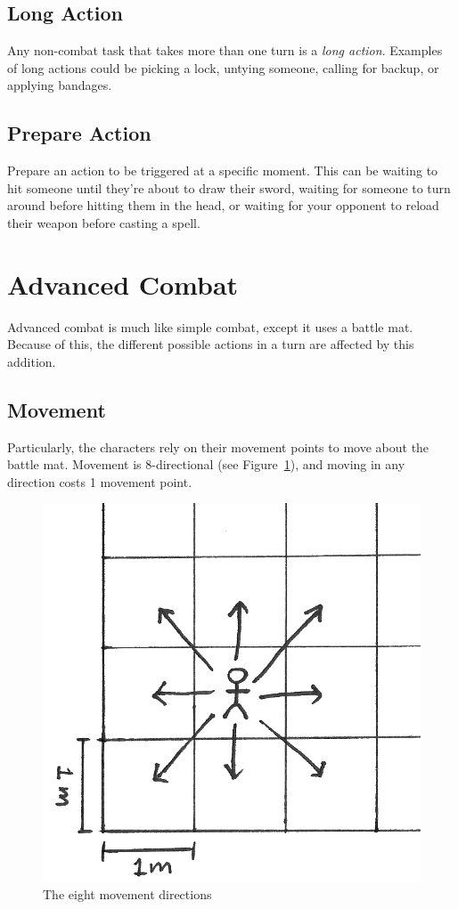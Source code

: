 \subsection{Long Action}
Any non-combat task that takes more than one turn is a \textit{long action}.
Examples of long actions could be picking a lock, untying someone, calling for backup, or applying bandages.

\subsection{Prepare Action}
Prepare an action to be triggered at a specific moment.
This can be waiting to hit someone until they're about to draw their sword, waiting for someone to turn around before hitting them in the head, or waiting for your opponent to reload their weapon before casting a spell.

\newpage
\section{Advanced Combat}
Advanced combat is much like simple combat, except it uses a battle mat. Because of this, the different possible actions in a turn are affected by this addition.

\subsection{Movement}
Particularly, the characters rely on their movement points to move about the battle mat.
Movement is 8-directional (see Figure~\ref{fig:directions}), and moving in any direction costs 1 movement point.

\begin{figure}
    \centering
    \includegraphics{graphics/directions-trans.png}
    \caption{The eight movement directions}
    \label{fig:directions}
\end{figure}

